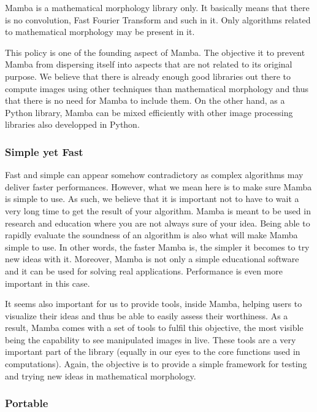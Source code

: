 \documentclass[a4paper,10pt,oneside]{article}
\begin{document}
Mamba is a mathematical morphology library only. It basically means
that there is no convolution, Fast Fourier Transform and such in it.
Only algorithms related to mathematical morphology may be present
in it.

This policy is one of the founding aspect of Mamba. The objective
it to prevent Mamba from dispersing itself into aspects that are not
related to its original purpose. We believe that there is already
enough good libraries out there to compute images using other techniques
than mathematical morphology and thus that there is no need for Mamba
to include them. On the other hand, as a Python library, Mamba can be
mixed efficiently with other image processing libraries also developped
in Python.


\subsubsection{Simple yet Fast}

Fast and simple can appear somehow contradictory as complex algorithms
may deliver faster performances. However, what we mean here is to
make sure Mamba is simple to use. As such, we believe that it is important
not to have to wait a very long time to get the result of your algorithm.
Mamba is meant to be used in research and education where you are
not always sure of your idea. Being able to rapidly evaluate the soundness
of an algorithm is also what will make Mamba simple to use. In other
words, the faster Mamba is, the simpler it becomes to try new ideas
with it. Moreover, Mamba is not only a simple educational software and
it can be used for solving real applications. Performance is even more
important in this case.

It seems also important for us to provide tools, inside Mamba, helping
users to \textquotedbl{}visualize\textquotedbl{} their ideas and thus
be able to easily assess their worthiness. As a result, Mamba comes
with a set of tools to fulfil this objective, the most visible being
the capability to see manipulated images in live. These tools are
a very important part of the library (equally in our eyes to the core
functions used in computations). Again, the objective is to provide
a simple framework for testing and trying new ideas in mathematical
morphology.


\subsubsection{Portable}
\end{document}

